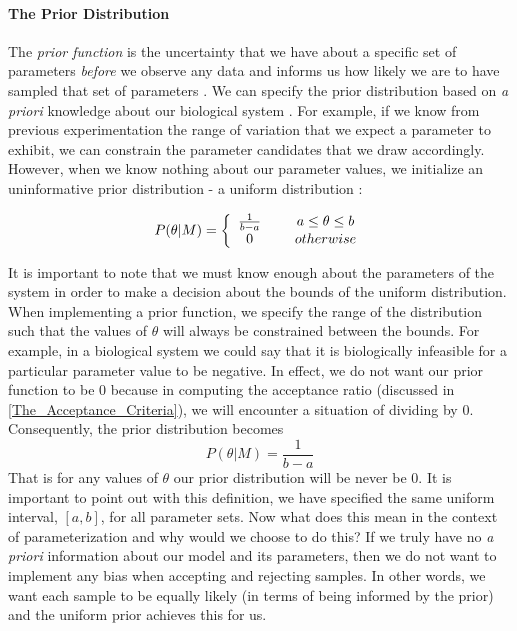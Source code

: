 \paragraph{The Prior Distribution} \label{section:ThePriorDistribution} The \emph{prior function} is the uncertainty that we have about a specific set of parameters \emph{before} we observe any data and informs us how likely we are to have sampled that set of parameters \cite{astrostats}. We can specify the prior distribution based on \textit{a priori} knowledge about our biological system \cite{bayesprior}. For example, if we know from previous experimentation the range of variation that we expect a parameter to exhibit, we can constrain the parameter candidates that we draw accordingly. However, when we know nothing about our parameter values, we initialize an uninformative prior distribution - a uniform distribution \cite{astrostats}:
\begin{center} \label{eq:3mcmc}
\begin{align}
  P(\theta|M) = \left\{ \begin{array}{cc} 
                \frac{1}{b-a} & \hspace{5mm} a \leq \theta \leq b \\
                0 & \hspace{5mm} otherwise \\
                \end{array} \right.
\end{align}
\end{center}
It is important to note that we must know enough about the parameters of the system in order to make a decision about the bounds of the uniform distribution. When implementing a prior function, we specify the range of the distribution such that the values of $\theta$ will always be constrained between the bounds. For example, in a biological system we could say that it is biologically infeasible for a particular parameter value to be negative. In effect, we do not want our prior function to be 0 because in computing the acceptance ratio (discussed in \ref{The_Acceptance_Criteria}), we will encounter a situation of dividing by 0. Consequently, the prior distribution becomes
\begin{equation} \label{eq:4mcmc}
P(\theta|M) = \frac{1}{b-a}
\end{equation}
That is for any values of $\theta$ our prior distribution will be never be 0. It is important to point out with this definition, we have specified the same uniform interval, $[a, b]$, for all parameter sets. Now what does this mean in the context of parameterization and why would we choose to do this? If we truly have no \emph{a priori} information about our model and its parameters, then we do not want to implement any bias when accepting and rejecting samples. In other words, we want each sample to be equally likely (in terms of being informed by the prior) and the uniform prior achieves this for us. 
